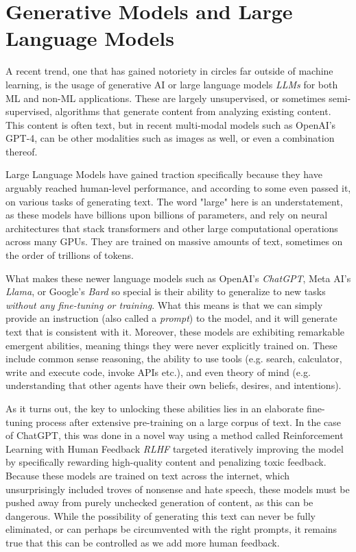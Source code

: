 
\section{Generative Models and Large Language Models}

A recent trend, one that has gained notoriety in circles far outside of machine learning, is the usage of generative AI
or large language models \textit{LLMs} for both ML and non-ML applications. These are largely unsupervised, or sometimes
semi-supervised, algorithms that generate content from analyzing existing content. This content is often text, but in recent
multi-modal models such as OpenAI's GPT-4\cite{openai2023gpt4}, can be other modalities such as images as well, or even a combination thereof.

Large Language Models have gained traction specifically because they have arguably reached human-level performance, and according
to some even passed it, on various tasks of generating text. The word "large" here is an understatement,
as these models have billions upon billions of parameters, and rely on neural architectures that stack transformers and other large
computational operations across many GPUs. They are trained on massive amounts of text, sometimes on the order of trillions\cite{touvron2023llama} of tokens.

What makes these newer language models such as OpenAI's \textit{ChatGPT}, Meta AI's \textit{Llama}\cite{touvron2023llama}, or Google's \textit{Bard} so special is their ability to generalize to new tasks \textit{without any fine-tuning or training}.
What this means is that we can simply provide an instruction (also called a \textit{prompt}) to the model, and it will generate text that is consistent with it.
Moreover, these models are exhibiting remarkable emergent abilities, meaning things they were never explicitly trained on.
These include common sense reasoning, the ability to use tools (e.g. search, calculator, write and execute code, invoke APIs etc.), and even theory of mind (e.g. understanding that other agents have their own beliefs, desires, and intentions)\cite{bubeck2023sparks,openai2023gpt4}.

As it turns out, the key to unlocking these abilities lies in an elaborate fine-tuning process after extensive pre-training on a large corpus of text.
In the case of ChatGPT, this was done in a novel way using a method called Reinforcement Learning with Human Feedback \textit{RLHF} targeted iteratively improving the model by specifically
rewarding high-quality content and penalizing toxic feedback.\cite{ouyang2022training} Because these models are trained on text across the internet, which
unsurprisingly included troves of nonsense and hate speech, these models must be pushed away from purely unchecked generation of content,
as this can be dangerous. While the possibility of generating this text can never be fully eliminated, or can perhaps be circumvented with the right prompts, it remains true that this can be controlled as we add more human feedback.

